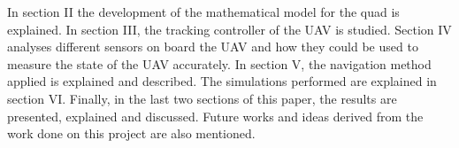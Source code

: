 \documentclass[journal]{IEEEtran}
\begin{document}
	In section II the development of the mathematical model for the quad is explained. In section III, the tracking controller of the UAV is studied. Section IV analyses different sensors on board the UAV and how they could be used to measure the state of the UAV accurately. In section V, the navigation method applied is explained and described. The simulations performed are explained in section VI. Finally, in the last two sections of this paper, the results are presented, explained and discussed. Future works and ideas derived from the work done on this project are also mentioned.

	\hfill 
	
	
	
	
	
\end{document}
